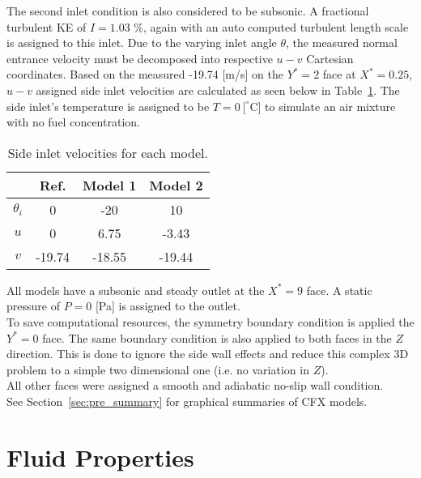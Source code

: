 The second inlet condition is also considered to be subsonic. A fractional turbulent KE of $I=1.03$ \%, again with an auto computed turbulent length scale \cite{projfaq} is assigned to this inlet. Due to the varying inlet angle $\theta$, the measured normal entrance velocity must be decomposed into respective $u-v$ Cartesian coordinates. Based on the measured -19.74 [m/s] on the $Y^*=2$ face at $X^*=0.25$, $u-v$ assigned side inlet velocities are calculated as seen below in Table~\ref{tab:sideinletbc}. The side inlet's temperature is assigned to be $T=0\ [ ^{\circ}$C] to simulate an air mixture with no fuel concentration.
 
\begin{table}[H]
	\centering
	\caption{Side inlet velocities for each model.}
	\begin{tabular}{cccc}
		\toprule		
		\multicolumn{1}{c}{} & \textbf{Ref.} & \textbf{Model 1} & \textbf{ Model 2} \\
		\midrule
		$\theta_i$	& 0            & -20             & 10		\\
		$u$			& 0            & 6.75            & -3.43	\\
		$v$ 		& -19.74       & -18.55          & -19.44	\\
		\bottomrule
	\end{tabular}
	\label{tab:sideinletbc}
\end{table}

All models have a subsonic and steady outlet at the $X^*=9$ face. A static pressure of $P=0$ [Pa] is assigned to the outlet.\\

To save computational resources, the symmetry boundary condition is applied the $Y^*=0$ face. The same boundary condition is also applied to both faces in the $Z$ direction. This is done to ignore the side wall effects and reduce this complex 3D problem to a simple two dimensional one (i.e. no variation in $Z$).\\

All other faces were assigned a smooth and adiabatic no-slip wall condition. \\

See Section~\ref{sec:pre_summary} for graphical summaries of CFX models.
\section{Fluid Properties}
\label{sec:pre_fluid}

